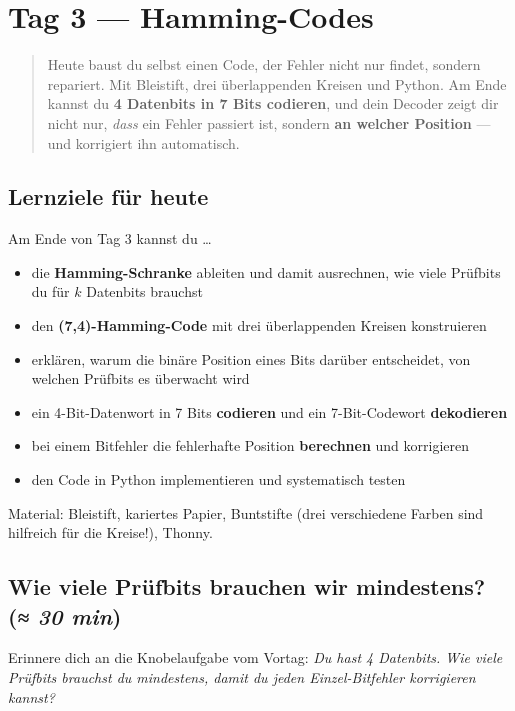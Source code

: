 \chapter{Tag 3 — Hamming-Codes}

\begin{quote}
Heute baust du selbst einen Code, der Fehler nicht nur findet, sondern
repariert. Mit Bleistift, drei überlappenden Kreisen und Python. Am Ende
kannst du \textbf{4 Datenbits in 7 Bits codieren}, und dein Decoder
zeigt dir nicht nur, \emph{dass} ein Fehler passiert ist, sondern
\textbf{an welcher Position} — und korrigiert ihn automatisch.
\end{quote}

\section*{Lernziele für heute}

Am Ende von Tag 3 kannst du \dots

\begin{itemize}
\item die \textbf{Hamming-Schranke} ableiten und damit ausrechnen, wie
  viele Prüfbits du für $k$ Datenbits brauchst
\item den \textbf{(7,4)-Hamming-Code} mit drei überlappenden Kreisen
  konstruieren
\item erklären, warum die binäre Position eines Bits darüber entscheidet,
  von welchen Prüfbits es überwacht wird
\item ein 4-Bit-Datenwort in 7 Bits \textbf{codieren} und ein
  7-Bit-Codewort \textbf{dekodieren}
\item bei einem Bitfehler die fehlerhafte Position \textbf{berechnen}
  und korrigieren
\item den Code in Python implementieren und systematisch testen
\end{itemize}

Material: Bleistift, kariertes Papier, Buntstifte (drei verschiedene
Farben sind hilfreich für die Kreise!), Thonny.

\section{Wie viele Prüfbits brauchen wir mindestens? \normalfont(\textit{≈ 30 min})}

Erinnere dich an die Knobelaufgabe vom Vortag: \emph{Du hast 4
Datenbits. Wie viele Prüfbits brauchst du mindestens, damit du jeden
Einzel-Bitfehler korrigieren kannst?}

